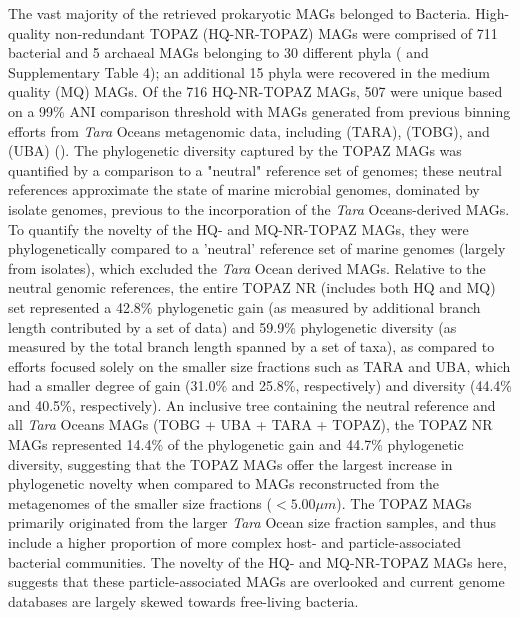 \documentclass[12pt]{article}
\numberwithin{equation}{section}
\begin{document}
The vast majority of the retrieved prokaryotic MAGs belonged to Bacteria. High-quality non-redundant TOPAZ (HQ-NR-TOPAZ) MAGs were comprised of 711 bacterial and 5 archaeal MAGs belonging to 30 different phyla ( and Supplementary Table 4); an additional 15 phyla were recovered in the medium quality (MQ) MAGs. Of the 716 HQ-NR-TOPAZ MAGs, 507 were unique based on a 99\% ANI comparison threshold with MAGs generated from previous binning efforts from \textit{Tara} Oceans metagenomic data, including \citet{Delmont2018Nitrogen-fixing} (TARA), \citet{Tully2018reconstruction} (TOBG), and \citet{Parks2017Recovery} (UBA) (). The phylogenetic diversity captured by the TOPAZ MAGs was quantified by a comparison to a "neutral" reference set of genomes; these neutral references approximate the state of marine microbial genomes, dominated by isolate genomes, previous to the incorporation of the \textit{Tara} Oceans-derived MAGs. To quantify the novelty of the HQ- and MQ-NR-TOPAZ MAGs, they were phylogenetically compared to a 'neutral' reference set of marine genomes (largely from isolates), which excluded the \textit{Tara} Ocean derived MAGs. Relative to the neutral genomic references, the entire TOPAZ NR (includes both HQ and MQ) set represented a 42.8\% phylogenetic gain (as measured by additional branch length contributed by a set of data) and 59.9\% phylogenetic diversity (as measured by the total branch length spanned by a set of taxa), as compared to efforts focused solely on the smaller size fractions such as TARA and UBA, which had a smaller degree of gain (31.0\% and 25.8\%, respectively) and diversity (44.4\% and 40.5\%, respectively). An inclusive tree containing the neutral reference and all \textit{Tara} Oceans MAGs (TOBG + UBA + TARA + TOPAZ), the TOPAZ NR MAGs represented 14.4\% of the phylogenetic gain and 44.7\% phylogenetic diversity, suggesting that the TOPAZ MAGs offer the largest increase in phylogenetic novelty when compared to MAGs reconstructed from the metagenomes of the smaller size fractions ($<5.00 \mu m$). The TOPAZ MAGs primarily originated from the larger \textit{Tara} Ocean size fraction samples, and thus include a higher proportion of more complex host- and particle-associated bacterial communities. The novelty of the HQ- and MQ-NR-TOPAZ MAGs here, suggests that these particle-associated MAGs are overlooked and current genome databases are largely skewed towards free-living bacteria.

\end{document}
